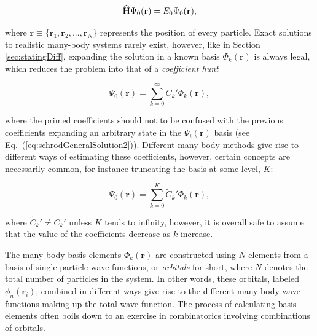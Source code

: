 \begin{equation}
 {\bf\widehat{H}}\Psi_0(\mathbf{r}) = E_0\Psi_0(\mathbf{r}),
 \end{equation}
 
where $\mathbf{r} \equiv \{\mathbf{r}_1, \mathbf{r}_2, ..., \mathbf{r}_N\}$ represents the position of every particle. Exact solutions to realistic many-body systems rarely exist, however, like in Section \ref{sec:statingDiff}, expanding the solution in a known basis $\Phi_k(\mathbf{r})$ is always legal, which reduces the problem into that of a \textit{coefficient hunt} 

\begin{equation}
\label{eq:manyBodyExp}
 \Psi_0(\mathbf{r}) = \sum_{k=0}^\infty C_k'\Phi_k(\mathbf{r}),
\end{equation}

where the primed coefficients should not to be confused with the previous coefficients expanding an arbitrary state in the $\Psi_i(\mathbf{r})$ basis (see Eq.~(\ref{eq:schrodGeneralSolution2})). Different many-body methods give rise to different ways of estimating these coefficients, however, certain concepts are necessarily common, for instance truncating the basis at some level, $K$:

\begin{equation}
 \Psi_0(\mathbf{r}) = \sum_{k=0}^K \tilde{C}_k'\Phi_k(\mathbf{r}), \label{eq:manybodyWFexp}
\end{equation}

where $ \tilde{C}_k' \ne  C_k'$ unless $K$ tends to infinity, however, it is overall safe to assume that the value of the coefficients decrease as $k$ increase. 

The many-body basis elements $\Phi_k(\mathbf{r})$ are constructed using $N$ elements from a basis of single particle wave functions, or \textit{orbitals} for short, where $N$ denotes the total number of particles in the system. In other words, these orbitals, labeled $\phi_n(\mathbf{r}_i)$, combined in different ways give rise to the different many-body wave functions making up the total wave function. The process of calculating basis elements often boils down to an exercise in combinatorics involving combinations of orbitals.

